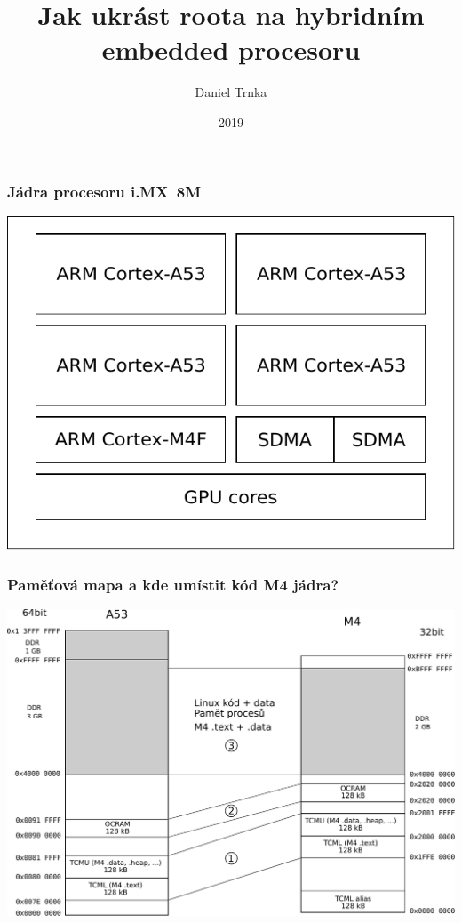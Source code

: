 \documentclass{beamer}
\title{Jak ukrást roota na hybridním embedded procesoru}
\author{Daniel Trnka}
\institute{}
\date{2019}
\begin{document}
 
\frame{\titlepage}
 
\begin{frame}
\frametitle{Jádra procesoru i.MX~8M}
\centering
\includegraphics{figures/cores.pdf}

\end{frame}

\begin{frame}
\frametitle{Paměťová mapa a kde umístit kód M4 jádra?}
\centering
\includegraphics[width=\linewidth]{figures/memory.pdf}
\end{frame}
\end{document}
